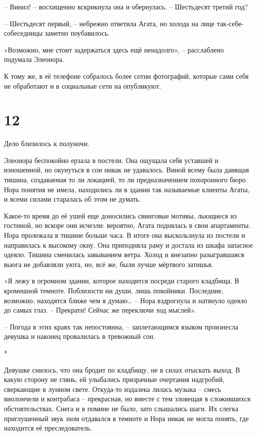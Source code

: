 \documentclass[
  a5paperpaper,
  DIV=11,
  numbers=noendperiod]{scrreprt}
\begin{document}
-- Винил! -- восхищенно вскрикнула она и обернулась. -- Шестьдесят
третий год?

-- Шестьдесят первый, -- небрежно ответила Агата, но холода на лице
так-себе-собеседницы заметно поубавилось.

«Возможно, мне стоит задержаться здесь ещё ненадолго», -- расслаблено
подумала Элеонора.

К тому же, в её телефоне собралось более сотни фотографий, которые сами
себя не обработают и в социальные сети на опубликуют.

\section*{12}\label{12}


Дело близилось к полуночи.

Элеонора беспокойно ерзала в постели. Она ощущала себя уставшей и
изношенной, но окунуться в сон никак не удавалось. Виной всему была
давящая тишина, создаваемая то ли локацией, то ли предназначением
похоронного бюро. Нора понятия не имела, находились ли в здании так
называемые клиенты Агаты, и всеми силами старалась об этом не думать.

Какое-то время до её ушей еще доносились свинговые мотивы, льющиеся из
гостиной, но вскоре они исчезли: вероятно, Агата поднялась в свои
апартаменты. Нора пролежала в тишине больше часа. В итоге она
выскользнула из постели и направилась к высокому окну. Она приподняла
раму и достала из шкафа запасное одеяло. Тишина сменилась завыванием
ветра. Холод и внезапно разыгравшаяся вьюга не добавляли уюта, но, всё
же, были лучше мёртвого затишья.

«Я лежу в огромном здании, которое находится посреди старого кладбища. В
кромешной темноте. Поблизости ни души, лишь покойники. Последние,
возможно, находятся ближе чем я думаю\ldots{} -- Нора вздрогнула и
натянуло одеяло до самых глаз. -- Прекрати! Сейчас же переключи ход
мыслей».

-- Погода в этих краях так непостоянна, -- заплетающимся языком
произнесла девушка и наконец провалилась в тревожный сон.

*

Девушке снилось, что она бродит по кладбищу, не в силах отыскать выход.
В какую сторону не глянь, ей улыбались призрачные очертания надгробий,
сверкающие в лунном свете. Откуда-то издалека лилась музыка -- смесь
виолончели и контрабаса -- прекрасная, но вместе с тем зловещая в
сложившихся обстоятельствах. Снега и в помине не было, зато слышались
шаги. Их слегка приглушенный звук эхом отдавался в темноте и Нора никак
не могла понять, где находится её преследователь.
\end{document}
